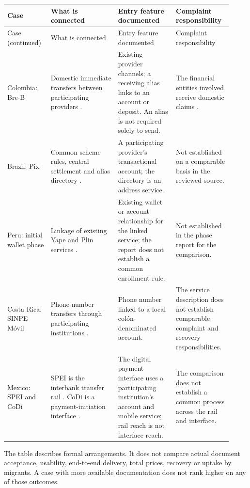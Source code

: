 {\small\begin{singlespace}
\begin{longtable}{@{}
  >{\raggedright\arraybackslash}p{0.17\linewidth}
  >{\raggedright\arraybackslash}p{0.29\linewidth}
  >{\raggedright\arraybackslash}p{0.24\linewidth}
  >{\raggedright\arraybackslash}p{0.22\linewidth}@{}}
\toprule
Case & What is connected & Entry feature documented & Complaint responsibility \\
\midrule
\endfirsthead
\toprule
Case (continued) & What is connected & Entry feature documented & Complaint responsibility \\
\midrule
\endhead
\bottomrule
\endlastfoot
Colombia: Bre-B & Domestic immediate transfers between participating providers \citep{banreptechnical2026}. & Existing provider channels; a receiving alias links to an account or deposit. An alias is not required solely to send. & The financial entities involved receive domestic claims \citep{banrepfaq}. \\
Brazil: Pix & Common scheme rules, central settlement and alias directory \citep{bcbpix}. & A participating provider's transactional account; the directory is an address service. & Not established on a comparable basis in the reviewed source. \\
Peru: initial wallet phase & Linkage of existing Yape and Plin services \citep{bcrp2025}. & Existing wallet or account relationship for the linked service; the report does not establish a common enrollment rule. & Not established in the phase report for the comparison. \\
Costa Rica: SINPE Móvil & Phone-number transfers through participating institutions \citep{bccrsinpe}. & Phone number linked to a local colón-denominated account. & The service description does not establish comparable complaint and recovery responsibilities. \\
Mexico: SPEI and CoDi & SPEI is the interbank transfer rail \citep{banxicospei}. CoDi is a payment-initiation interface \citep{banxicocodi}. & The digital payment interface uses a participating institution's account and mobile service; rail reach is not interface reach. & The comparison does not establish a common process across the rail and interface. \\
\end{longtable}
\end{singlespace}}

The table describes formal arrangements. It does not compare actual document acceptance, usability, end-to-end delivery, total prices, recovery or uptake by migrants. A case with more available documentation does not rank higher on any of those outcomes.

